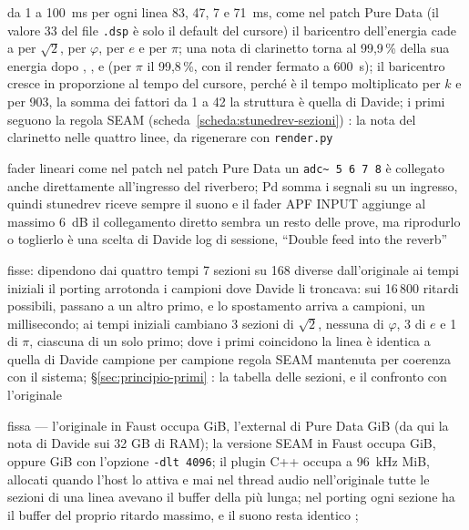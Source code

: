 {da 1 a \qty{100}{\milli\second} per ogni linea}
{83, 47, 7 e \qty{71}{\milli\second}, come nel patch Pure Data (il valore 33 del file \texttt{.dsp} è solo il default del cursore)}
{il baricentro dell'energia cade a  per $\sqrt{2}$,  per $\varphi$,  per $e$ e  per $\pi$; una nota di clarinetto torna al 99,9\,\% della sua energia dopo , ,  e  (per $\pi$ il 99,8\,\%, con il render fermato a 600~s); il baricentro cresce in proporzione al tempo del cursore, perché è il tempo moltiplicato per $k$ e per 903, la somma dei fattori da 1 a 42}
{la struttura è quella di Davide; i primi seguono la regola SEAM (scheda~\ref{scheda:stunedrev-sezioni})}
{\daprovare}
{: la nota del clarinetto nelle quattro linee, da rigenerare con \texttt{render.py}}

{fader lineari}
{come nel patch}
{nel patch Pure Data un \texttt{adc\textasciitilde{} 5 6 7 8} è collegato anche direttamente all'ingresso del riverbero; Pd somma i segnali su un ingresso, quindi stunedrev riceve sempre il suono e il fader APF INPUT aggiunge al massimo 6~dB}
{il collegamento diretto sembra un resto delle prove, ma riprodurlo o toglierlo è una scelta di Davide}
{\domanda}
{log di sessione, ``Double feed into the reverb''}

{fisse: dipendono dai quattro tempi}
{7 sezioni su 168 diverse dall'originale ai tempi iniziali}
{il porting arrotonda i campioni dove Davide li troncava: sui 16\,800 ritardi possibili,  passano a un altro primo, e lo spostamento arriva a  campioni, un millisecondo; ai tempi iniziali cambiano 3 sezioni di $\sqrt{2}$, nessuna di $\varphi$, 3 di $e$ e 1 di $\pi$, ciascuna di un solo primo; dove i primi coincidono la linea è identica a quella di Davide campione per campione}
{regola SEAM mantenuta per coerenza con il sistema; \S\ref{sec:principio-primi}}
{\deciso}
{: la tabella delle sezioni, e il confronto con l'originale}

{fissa}
{---}
{l'originale in Faust occupa  GiB, l'external di Pure Data  GiB (da qui la nota di Davide sui 32 GB di RAM); la versione SEAM in Faust occupa  GiB, oppure  GiB con l'opzione \texttt{-dlt 4096}; il plugin C++ occupa a \qty{96}{\kilo\hertz}  MiB, allocati quando l'host lo attiva e mai nel thread audio}
{nell'originale tutte le sezioni di una linea avevano il buffer della più lunga; nel porting ogni sezione ha il buffer del proprio ritardo massimo, e il suono resta identico}
{\deciso}
{; }

